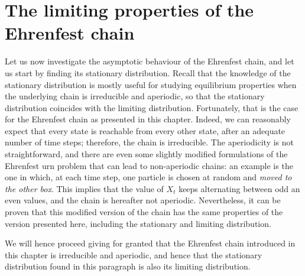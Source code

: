 \section{The limiting properties of the Ehrenfest chain}
Let us now investigate the asymptotic behaviour of the Ehrenfest chain, and let us start by finding its stationary distribution. Recall that the knowledge of the stationary distribution is mostly useful for studying equilibrium properties when the underlying chain is irreducible and aperiodic, so that the stationary distribution coincides with the limiting distribution. Fortunately, that is the case for the Ehrenfest chain as presented in this chapter. Indeed, we can reasonably expect that every state is reachable from every other state, after an adequate number of time steps; therefore, the chain is irreducible. The aperiodicity is not straightforward, and there are even some slightly modified formulations of the Ehrenfest urn problem that can lead to non-aperiodic chains: an example is the one in which, at each time step, one particle is chosen at random and \emph{moved to the other box}. This implies that the value of $X_t$ keeps alternating between odd an even values, and the chain is hereafter not aperiodic. Nevertheless, it can be proven that this modified version of the chain has the same properties of the version presented here, including the stationary and limiting distribution. 

We will hence proceed giving for granted that the Ehrenfest chain introduced in this chapter is irreducible and aperiodic, and hence that the stationary distribution found in this paragraph is also its limiting distribution.

